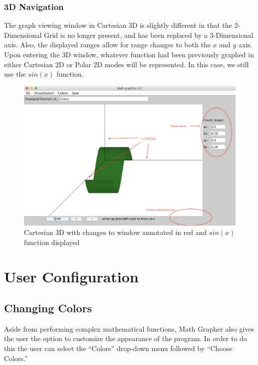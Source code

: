 \documentclass{article}[12 pt]
\begin{document}
		\subsubsection{3D Navigation}
		The graph viewing window in Cartesian 3D is slightly different in that the 2-Dimensional Grid is no longer present, and has been replaced by a 3-Dimensional axis. Also, the displayed ranges allow for range changes to both the $x$ and $y$ axis. Upon entering the 3D window, whatever function had been previously graphed in either Cartesian 2D or Polar 2D modes will be represented. In this case, we still use the $sin(x)$ function. 
			\begin{figure}[h!]
			\centering
			\includegraphics[scale=.35]{3DView}
			\caption{Cartesian 3D with changes to window annotated in red and $sin(x)$ function displayed}
			\end{figure}

		\section{User Configuration}
		\subsection{Changing Colors}
		Aside from performing complex mathematical functions, Math Grapher also gives the user the option to customize the appearance of the program. In order to do this the user can select the ``Colors'' drop-down menu followed by ``Choose Colors.'' 
\end{document}
